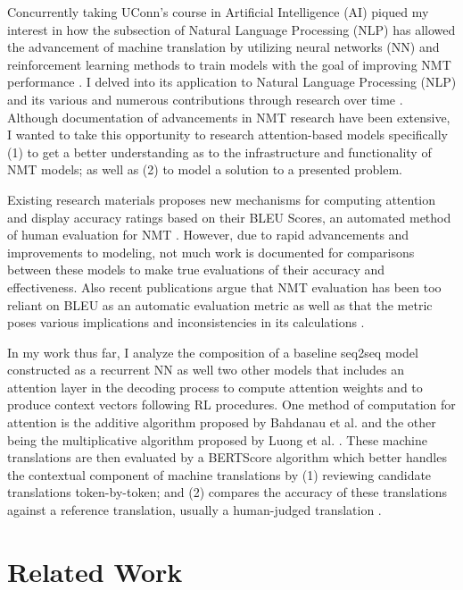 \documentclass[conference]{IEEEtran}
\begin{document}
Concurrently taking UConn's course in Artificial Intelligence (AI) piqued my interest in how the subsection of Natural Language Processing (NLP) has allowed the advancement of machine translation by utilizing neural networks (NN) and reinforcement learning methods to train models with the goal of improving NMT performance \cite{b2}. I delved into its application to Natural Language Processing (NLP) and its various and numerous contributions through research over time \cite{b1}. Although documentation of advancements in NMT research have been extensive, I wanted to take this opportunity to research attention-based models specifically (1) to get a better understanding as to the infrastructure and functionality of NMT models; as well as (2) to model a solution to a presented problem.

\par

Existing research materials proposes new mechanisms for computing attention and display accuracy ratings based on their BLEU Scores, an automated method of human evaluation for NMT \cite{b3}. However, due to rapid advancements and improvements to modeling, not much work is documented for comparisons between these models to make true evaluations of their accuracy and effectiveness. Also recent publications argue that NMT evaluation has been too reliant on BLEU as an automatic evaluation metric \cite{b5} as well as that the metric poses various implications and inconsistencies in its calculations \cite{b4}. 

\par

In my work thus far, I analyze the composition of a baseline seq2seq model constructed as a recurrent NN as well two other models that includes an attention layer in the decoding process to compute attention weights and to produce context vectors following RL procedures. One method of computation for attention is the additive algorithm proposed by Bahdanau et al. \cite{b7} and the other being the multiplicative algorithm proposed by Luong et al. \cite{b8}. These machine translations are then evaluated by a BERTScore algorithm which better handles the contextual component of machine translations by (1) reviewing candidate translations token-by-token; and (2) compares the accuracy of these translations against a reference translation, usually a human-judged translation \cite{b6}.

\section{Related Work}
\end{document}
